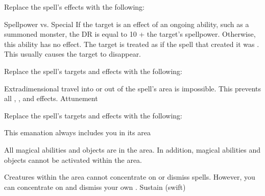 Replace the spell's effects with the following:
\begin{spellcontent}
\begin{augmenteffects}
\begin{spellattack}{Spellpower vs. Special}
\spellspecial
If the target is an effect of an ongoing  ability, such as a summoned monster, the DR is equal to 10 + the target's spellpower.
Otherwise, this ability has no effect.
\spellsuccess
The target is treated as if the spell that created it was .
This usually causes the target to disappear.
\end{spellattack}
\end{augmenteffects}
\end{spellcontent}
Replace the spell's targets and effects with the following:
\begin{spellcontent}
\begin{augmenttargetinginfo}
\end{augmenttargetinginfo}
\begin{augmenteffects}
\spelleffect
Extradimensional travel into or out of the spell's area is impossible.
This prevents all , , and  effects.
\spelldur Attunement
\end{augmenteffects}
\end{spellcontent}
Replace the spell's targets and effects with the following:
\begin{spellcontent}
\begin{augmenttargetinginfo}
\spellspecial This emanation always includes you in its area
\end{augmenttargetinginfo}
\begin{augmenteffects}
\spelleffect
All magical abilities and objects are  in the area.
In addition, magical abilities and objects cannot be activated within the area.
\par Creatures within the area cannot concentrate on or dismiss spells. However, you can concentrate on and dismiss your own .
\spelldur Sustain (swift)
\end{augmenteffects}
\end{spellcontent}
